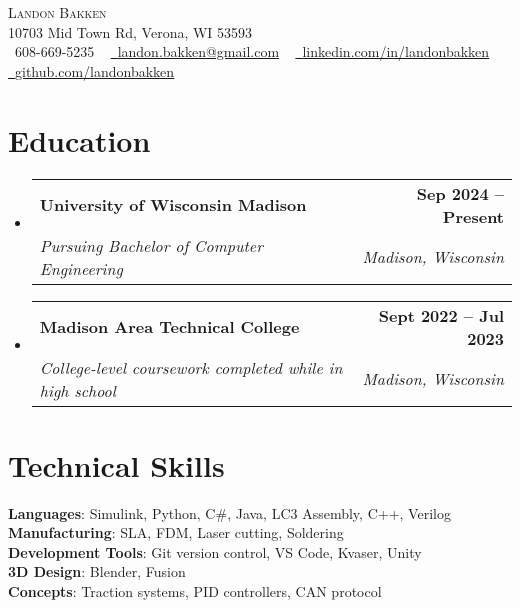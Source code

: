 \documentclass[letterpaper,11pt]{article}
\makeatletter
\newcommand{\resumeSubheading}[4]{
  \vspace{-2pt}\item
    \begin{tabular*}{1.0\textwidth}[t]{l@{\extracolsep{\fill}}r}
      \textbf{#1} & \textbf{\small #2} \\
      \textit{\small#3} & \textit{\small #4} \\
    \end{tabular*}\vspace{-7pt}
}
\newcommand{\resumeSubHeadingListStart}{\begin{itemize}[leftmargin=0.0in, label={}]}
\newcommand{\resumeSubHeadingListEnd}{\end{itemize}}
\makeatother
\begin{document}

\begin{center}
    {\Huge \scshape Landon Bakken} \\ \vspace{1pt}
    10703 Mid Town Rd, Verona, WI 53593 \\ \vspace{1pt}
    \small \raisebox{-0.1\height}\faPhone\ 608-669-5235 ~ \href{mailto:x@gmail.com}{\raisebox{-0.2\height}\faEnvelope\  \underline{landon.bakken@gmail.com}} ~ 
    \href{https://linkedin.com/in//}{\raisebox{-0.2\height}\faLinkedin\ \underline{linkedin.com/in/landonbakken}}  ~
    \href{https://github.com/}{\raisebox{-0.2\height}\faGithub\ \underline{github.com/landonbakken}}
    \vspace{-8pt}
\end{center}


\section{Education}
  \resumeSubHeadingListStart
    \resumeSubheading
      {University of Wisconsin Madison}{Sep 2024 -- Present}
      {Pursuing Bachelor of Computer Engineering}{Madison, Wisconsin}
    \resumeSubheading
      {Madison Area Technical College}{Sept 2022 -- Jul 2023}
      {College-level coursework completed while in high school}{Madison, Wisconsin}
  \resumeSubHeadingListEnd
\vspace{-8pt}


\section{Technical Skills}
 \begin{itemize}[leftmargin=0.15in, label={}]
    \small{\item{
     \textbf{Languages}{: Simulink, Python, C\#, Java, LC3 Assembly, C++, Verilog} \\
     \textbf{Manufacturing}{: SLA, FDM, Laser cutting, Soldering} \\
     \textbf{Development Tools}{: Git version control, VS Code, Kvaser, Unity} \\
     \textbf{3D Design}{: Blender, Fusion} \\
     \textbf{Concepts}{: Traction systems, PID controllers, CAN protocol} }}
 \end{itemize}
 \vspace{-15pt}
\end{document}
